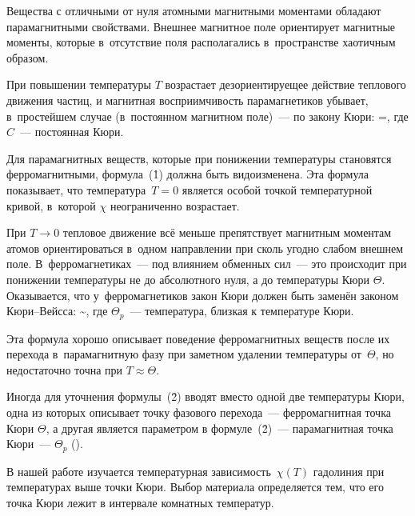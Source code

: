 


Вещества с отличными от нуля атомными магнитными моментами обладают парамагнитными свойствами. Внешнее магнитное поле
ориентирует магнитные моменты, которые в~отсутствие поля располагались в~пространстве хаотичным образом.

При повышении температуры $T$ возрастает дезориентируещее действие теплового движения частиц, и магнитная
восприимчивость парамагнетиков убывает, в~простейшем случае (в~постоянном магнитном поле)~--- по закону Кюри:
\chi=,
\ee
где $C$~--- постоянная Кюри.

Для парамагнитных веществ, которые при понижении температуры становятся ферромагнитными, формула~(\r{1}) должна быть
видоизменена. Эта формула показывает, что температура~$T=0$ является особой точкой температурной кривой, в~которой
$\chi$ неограниченно возрастает.


При $T\to 0$ тепловое движение всё меньше препятствует магнитным моментам атомов ориентироваться в~одном направлении при
сколь угодно слабом внешнем поле. В~ферромагнетиках~--- под влиянием обменных сил~--- это происходит при понижении
температуры не до абсолютного нуля, а до температуры Кюри $\Theta$. Оказывается, что у~ферромагнетиков закон Кюри должен
быть заменён законом Кюри--Вейсса:
\chi\sim {},
\ee
где $\Theta_p$~--- температура, близкая к температуре Кюри.

Эта формула хорошо описывает поведение ферромагнитных веществ после их перехода в~парамагнитную фазу при заметном
удалении температуры от~$\Theta$, но недостаточно точна при $T\approx \Theta$.

Иногда для уточнения формулы~(\r{2}) вводят вместо одной две температуры Кюри, одна из которых описывает точку фазового
перехода~--- ферромагнитная точка Кюри $\Theta$, а другая является параметром в формуле~(\r{2})~--- парамагнитная точка
Кюри~--- $\Theta_p$ ().

В нашей работе изучается температурная зависимость~$\chi(T)$ гадолиния при температурах выше точки Кюри. Выбор материала
определяется тем, что его точка Кюри лежит в интервале комнатных температур.

